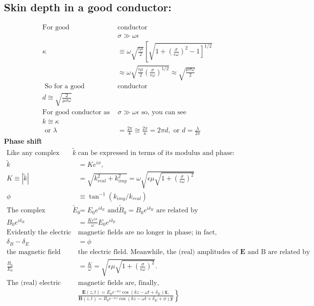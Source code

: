 \subsection{ Skin depth in a good conductor:}
\begin{align*}
\text{For good }&\text{conductor}\\
&\sigma \gg \omega \epsilon\\
\kappa & \equiv \omega \sqrt{\frac{\epsilon \mu}{2}}\left[\sqrt{\left.1+\left(\frac{\sigma}{\epsilon \omega}\right)^{2}-1\right]^{1 / 2}}\right.\\
& \approx \omega \sqrt{\frac{\epsilon \mu}{2}\left(\frac{\sigma}{\epsilon \omega}\right)^{1 / 2}} \approx \sqrt{\frac{\mu \sigma \omega}{2}}\\
\text{ So for a good  }&\text{conductor}\\
d \cong \sqrt{\frac{2}{\mu \sigma \omega}}\\
\text{For good conductor as }&\text{$\sigma \gg \omega \epsilon$ so, you can see}\\
k \cong \kappa\\
\text{ or }
\lambda&=\frac{2 \pi}{k} \cong \frac{2 \pi}{\kappa}=2 \pi d, \text { or } d=\frac{\lambda}{2 \pi}
\end{align*}
\textbf{Phase shift}
\begin{align*}
\text{Like any complex number, $\tilde{k}$ }&\text{can be expressed in terms of its modulus and phase:}\\
\tilde{k}&=K e^{i \phi},\\
K \equiv|\tilde{k}|&=\sqrt{k_{real}^{2}+k_{img}^{2}}=\omega \sqrt{\epsilon \mu \sqrt{1+\left(\frac{\sigma}{\epsilon \omega}\right)^{2}}} \\
\phi &\equiv \tan ^{-1}(k_{img} / k_{real})\\
\text{The complex amplitudes }\tilde{E}_{0}&=E_{0} e^{i \delta_{E}}\text{ and} \tilde{B}_{0}=B_{0} e^{i \delta_{B}}\text{ are related by }\\
B_{0} e^{i \delta_{B}}&=\frac{K e^{i \phi}}{\omega} E_{0} e^{i \delta_{E}}\\
\text{Evidently the electric and }&\text{magnetic fields are no longer in phase; in fact,}\\
\delta_{B}-\delta_{E}&=\phi\\
\text{the magnetic field lags behind }&\text{the electric fleld. Meanwhile, the (real) amplitudes of $\mathbf{E}$ and B are related by}\\
\frac{B_{0}}{E_{0}}&=\frac{K}{\omega}=\sqrt{\epsilon \mu \sqrt{1+\left(\frac{\sigma}{\epsilon \omega}\right)^{2}}} .\\
\text{The (real) electric and }&\text{magnetic fields are, finally,}\\
&\left.\frac{\mathbf{E}(z, t)=E_{0} e^{-\kappa z} \cos \left(k z-\omega t+\delta_{E}\right) \hat{\mathbf{x}},}{\mathbf{B}(z, t)=B_{0} e^{-\kappa z} \cos \left(k z-\omega t+\delta_{E}+\phi\right) \hat{\mathbf{y}}}\right\}
\end{align*}
